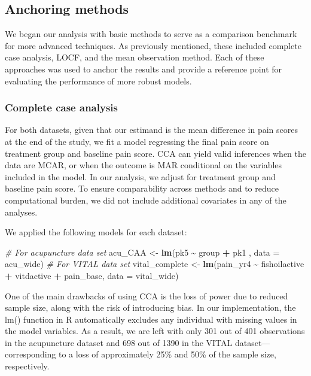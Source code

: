 \documentclass{article}
\newenvironment{Shaded}{\begin{snugshade}}{\end{snugshade}}
\newcommand{\AttributeTok}[1]{\textcolor[rgb]{0.13,0.29,0.53}{#1}}
\newcommand{\CommentTok}[1]{\textcolor[rgb]{0.56,0.35,0.01}{\textit{#1}}}
\newcommand{\FunctionTok}[1]{\textcolor[rgb]{0.13,0.29,0.53}{\textbf{#1}}}
\newcommand{\NormalTok}[1]{#1}
\newcommand{\OtherTok}[1]{\textcolor[rgb]{0.56,0.35,0.01}{#1}}
\newcommand{\SpecialCharTok}[1]{\textcolor[rgb]{0.81,0.36,0.00}{\textbf{#1}}}
\begin{document}
\subsection{Anchoring methods}\label{anchoring-methods}

We began our analysis with basic methods to serve as a comparison
benchmark for more advanced techniques. As previously mentioned, these
included complete case analysis, LOCF, and the mean observation method.
Each of these approaches was used to anchor the results and provide a
reference point for evaluating the performance of more robust models.

\subsubsection{Complete case analysis}\label{complete-case-analysis}

For both datasets, given that our estimand is the mean difference in
pain scores at the end of the study, we fit a model regressing the final
pain score on treatment group and baseline pain score. CCA can yield
valid inferences when the data are MCAR, or when the outcome is MAR
conditional on the variables included in the model. In our analysis, we
adjust for treatment group and baseline pain score. To ensure
comparability across methods and to reduce computational burden, we did
not include additional covariates in any of the analyses.

We applied the following models for each dataset:

\begin{Shaded}
\begin{Highlighting}[]
\CommentTok{\# For acupuncture data set}
\NormalTok{acu\_CAA }\OtherTok{\textless{}{-}} \FunctionTok{lm}\NormalTok{(pk5 }\SpecialCharTok{\textasciitilde{}}\NormalTok{ group }\SpecialCharTok{+}\NormalTok{ pk1 , }\AttributeTok{data =}\NormalTok{ acu\_wide)}
\CommentTok{\# For VITAL data set}
\NormalTok{vital\_complete }\OtherTok{\textless{}{-}} \FunctionTok{lm}\NormalTok{(pain\_yr4 }\SpecialCharTok{\textasciitilde{}}\NormalTok{ fishoilactive }\SpecialCharTok{+}\NormalTok{ vitdactive }\SpecialCharTok{+}\NormalTok{ pain\_base, }\AttributeTok{data =}\NormalTok{ vital\_wide)}
\end{Highlighting}
\end{Shaded}

One of the main drawbacks of using CCA is the loss of power due to
reduced sample size, along with the risk of introducing bias. In our
implementation, the lm() function in R automatically excludes any
individual with missing values in the model variables. As a result, we
are left with only 301 out of 401 observations in the acupuncture
dataset and 698 out of 1390 in the VITAL dataset---corresponding to a
loss of approximately 25\% and 50\% of the sample size, respectively.
\end{document}
